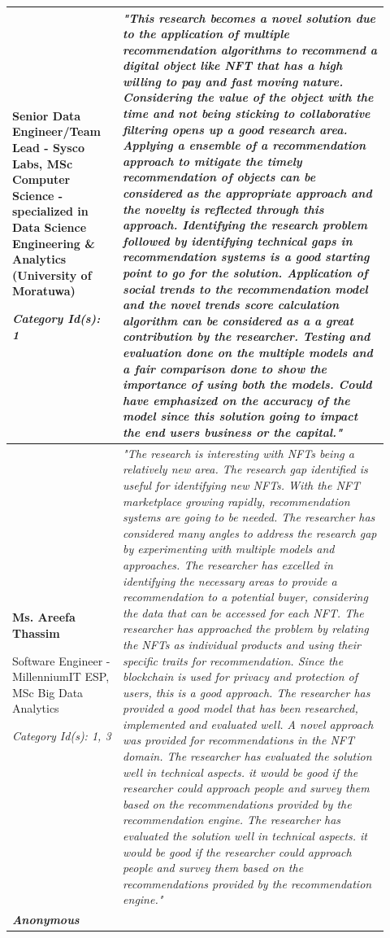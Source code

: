 \begin{longtable}{|p{0.27\linewidth}|p{0.655\linewidth}|}
Senior Data Engineer/Team Lead - Sysco Labs, MSc Computer Science - specialized in Data Science Engineering \& Analytics (University of Moratuwa)

\textit{Category Id(s): 1}
 &
\textit{"This research becomes a novel solution due to the application of multiple recommendation algorithms to recommend a digital object like NFT that has a high willing to pay and fast moving nature. Considering the value of the object with the time and not being sticking to collaborative filtering opens up a good research area. Applying a ensemble of a recommendation approach to mitigate the timely recommendation of objects can be considered as the appropriate approach and the novelty is reflected through this approach. Identifying the research problem followed by identifying technical gaps in recommendation systems is a good starting point to go for the solution. Application of social trends to the recommendation model and the novel trends score calculation algorithm can be considered as a a great contribution by the researcher. Testing and evaluation done on the multiple models and a fair comparison done to show the importance of using both the models.
Could have emphasized on the accuracy of the model since this solution going to impact the end users business or the capital."}
\\
\hline
\textbf{Ms. Areefa Thassim}

Software Engineer - MillenniumIT ESP,
MSc Big Data Analytics

\textit{Category Id(s): 1, 3}
 & 
 \textit{"The research is interesting with NFTs being a relatively new area. The research gap identified is useful for identifying new NFTs. With the NFT marketplace growing rapidly, recommendation systems are going to be needed. The researcher has considered many angles to address the research gap by experimenting with multiple models and approaches. The researcher has excelled in identifying the necessary areas to provide a recommendation to a potential buyer, considering the data that can be accessed for each NFT. The researcher has approached the problem by relating the NFTs as individual products and using their specific traits for recommendation. Since the blockchain is used for privacy and protection of users, this is a good approach. The researcher has provided a good model that has been researched, implemented and evaluated well. A novel approach was provided for recommendations in the NFT domain. The researcher has evaluated the solution well in technical aspects. it would be good if the researcher could approach people and survey them based on the recommendations provided by the recommendation engine. The researcher has evaluated the solution well in technical aspects. it would be good if the researcher could approach people and survey them based on the recommendations provided by the recommendation engine."}
 \\
\hline
\textbf{\textit{Anonymous}}


\end{longtable}
